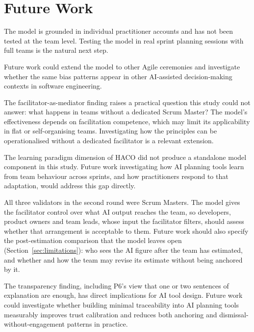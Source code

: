 \documentclass[a4paper,twoside]{bth}
\begin{document}
\section{Future Work}
\label{sec:futurework}

The model is grounded in individual practitioner accounts and has not been tested at the team level. Testing the model in real sprint planning sessions with full teams is the natural next step.

Future work could extend the model to other Agile ceremonies and investigate whether the same bias patterns appear in other AI-assisted decision-making contexts in software engineering.

The facilitator-as-mediator finding raises a practical question this study could not answer: what happens in teams without a dedicated Scrum Master? The model's effectiveness depends on facilitation competence, which may limit its applicability in flat or self-organising teams. Investigating how the principles can be operationalised without a dedicated facilitator is a relevant extension.

The learning paradigm dimension of HACO did not produce a standalone model component in this study. Future work investigating how AI planning tools learn from team behaviour across sprints, and how practitioners respond to that adaptation, would address this gap directly.

All three validators in the second round were Scrum Masters. The model gives the facilitator control over what AI output reaches the team, so developers, product owners and team leads, whose input the facilitator filters, should assess whether that arrangement is acceptable to them. Future work should also specify the post-estimation comparison that the model leaves open (Section~\ref{sec:limitations}): who sees the AI figure after the team has estimated, and whether and how the team may revise its estimate without being anchored by it.

The transparency finding, including P6's view that one or two sentences of explanation are enough, has direct implications for AI tool design. Future work could investigate whether building minimal traceability into AI planning tools measurably improves trust calibration and reduces both anchoring and dismissal-without-engagement patterns in practice.
\end{document}
